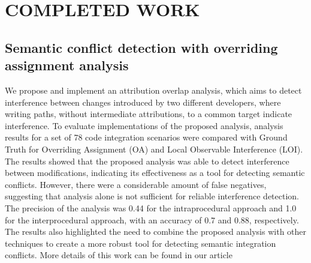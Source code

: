 \documentclass[sigconf,review]{acmart}
\begin{document}


\section{COMPLETED WORK}
\subsection{Semantic conflict detection with overriding assignment analysis}
We propose and implement an attribution overlap analysis, which aims to detect interference between changes introduced by two different developers, where writing paths, without intermediate attributions, to a common target indicate interference. To evaluate implementations of the proposed analysis, analysis results for a set of 78 code integration scenarios were compared with Ground Truth for Overriding Assignment (OA) and Local Observable Interference (LOI). The results showed that the proposed analysis was able to detect interference between modifications, indicating its effectiveness as a tool for detecting semantic conflicts. However, there were a considerable amount of false negatives, suggesting that analysis alone is not sufficient for reliable interference detection. The precision of the analysis was 0.44 for the intraprocedural approach and 1.0 for the interprocedural approach, with an accuracy of 0.7 and 0.88, respectively. The results also highlighted the need to combine the proposed analysis with other techniques to create a more robust tool for detecting semantic integration conflicts. More details of this work can be found in our article \cite{10.1145/3555228.3555242}
\end{document}
